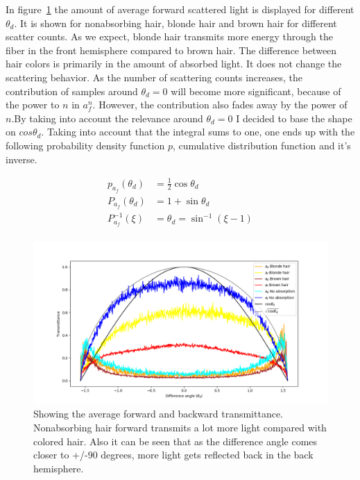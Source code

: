 \documentclass[12pt,a4paper,twoside]{article}
\begin{document}
In figure~\ref{fig:average_ab_af} the amount of average forward scattered light is displayed for different $\theta_d$. It is shown for nonabsorbing hair, blonde hair and brown hair for different scatter counts. As we expect, blonde hair transmits more energy through the fiber in the front hemisphere compared to brown hair. The difference between hair colors is primarily in the amount of absorbed light. It does not change the scattering behavior. As the number of scattering counts increases, the contribution of samples around $\theta_d = 0$ will become more significant, because of the power to $n$ in $a_f^n$. However, the contribution also fades away by the power of $n$.By taking into account the relevance around $\theta_d = 0$ I decided to base the shape on $cos \theta_d$. Taking into account that the integral sums to one, one ends up with the following probability density function $p$, cumulative distribution function and it's inverse.

\begin{align}
p_{a_f}(\theta_d) & = \frac{1}{2} \cos \theta_d \\
P_{a_f}(\theta_d) & = 1 + \sin \theta_d\\
P^{-1}_{a_f}(\xi) & = \theta_d = \sin^{-1}(\xi - 1) \\
\end{align}

\begin{figure}
  \includegraphics[width=\linewidth]{average_forward_backward_scattering_attenuation.png}
  \caption{Showing the average forward and backward transmittance. Nonabsorbing hair forward transmits a lot more light compared with colored hair. Also it can be seen that as the difference angle comes closer to +/-90 degrees, more light gets reflected back in the back hemisphere.}
  \label{fig:average_ab_af}
\end{figure}
\end{document}
